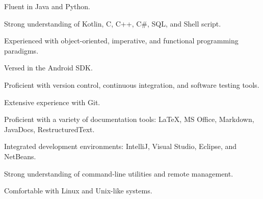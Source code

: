 
\begin{cvskills}
    {
      \begin{cvitems}
        \item {Fluent in Java and Python.}
        \item {Strong understanding of Kotlin, C, C++, C\#, SQL, and Shell script.}
        \item {Experienced with object-oriented, imperative, and functional programming paradigms.}
        \item {Versed in the Android SDK.}
      \end{cvitems}
    }

  {
    \begin{cvitems}
      \item {Proficient with version control, continuous integration, and software testing tools.}
      \item {Extensive experience with Git.}
      \item {Proficient with a variety of documentation tools: \LaTeX, MS Office, Markdown, JavaDocs, RestructuredText.}
    \end{cvitems}
  }

    {
      \begin{cvitems}
        \item {Integrated development environments: IntelliJ, Visual Studio, Eclipse, and NetBeans.}
        \item {Strong understanding of command-line utilities and remote management.}
        \item {Comfortable with Linux and Unix-like systems.}
      \end{cvitems}
    }

\end{cvskills}
